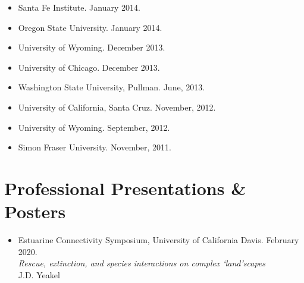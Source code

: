 \documentclass[margin,line,12pt]{res}
\begin{document}
\begin{resume}
\begin{itemize}
\item Santa Fe Institute. January 2014.

\item Oregon State University. January 2014.

\item University of Wyoming. December 2013.

\item University of Chicago. December 2013.

\item Washington State University, Pullman. June, 2013.

\item University of California, Santa Cruz. November, 2012.

\item University of Wyoming. September, 2012.

\item Simon Fraser University. November, 2011.
\end{itemize}

\section{\sc Professional Presentations \& Posters}
\begin{itemize}

\item Estuarine Connectivity Symposium, University of California Davis. February 2020.\\
\emph{Rescue, extinction, and species interactions on complex `land'scapes}\\
J.D. Yeakel


\end{itemize}
\end{resume}
\end{document}

